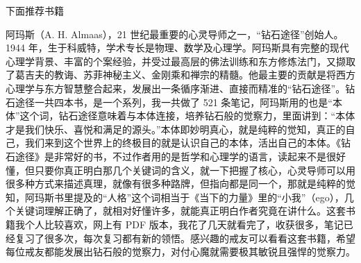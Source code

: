 下面推荐书籍

\begin{book}
    阿玛斯（A. H. Almaas），21 世纪最重要的心灵导师之一，“钻石途径”创始人。1944 年，生于科威特，学术专长是物理、数学及心理学。阿玛斯具有完整的现代心理学背景、丰富的个案经验，并受过最高层的佛法训练和东方修炼法门，又撷取了葛吉夫的教诲、苏菲神秘主义、金刚乘和禅宗的精髓。他最主要的贡献是将西方心理学与东方智慧整合起来，发展出一条循序渐进、直接而精准的“钻石途径”。钻石途径一共四本书，是一个系列，我一共做了 521 条笔记，阿玛斯用的也是“本体”这个词，钻石途径意味着与本体连接，培养钻石般的觉察力，里面讲到：“本体才是我们快乐、喜悦和满足的源头。”本体即妙明真心，就是纯粹的觉知，真正的自己，我们来到这个世界上的终极目的就是认识自己的本体，活出自己的本体。《钻石途径》是非常好的书，不过作者用的是哲学和心理学的语言，读起来不是很好懂，但只要你真正明白那几个关键词的含义，就一下把握了核心，心灵导师可以用很多种方式来描述真理，就像有很多种路牌，但指向都是同一个，那就是纯粹的觉知，阿玛斯书里提及的“人格”这个词相当于《当下的力量》里的“小我”（ego），几个关键词理解正确了，就相对好懂许多，就能真正明白作者究竟在讲什么。这套书籍我个人比较喜欢，网上有 PDF 版本，我花了几天就看完了，收获很多，笔记已经复习了很多次，每次复习都有新的领悟。感兴趣的戒友可以看看这套书籍，希望每位戒友都能发展出钻石般的觉察力，对付心魔就需要极其敏锐且强悍的觉察力。
\end{book}
